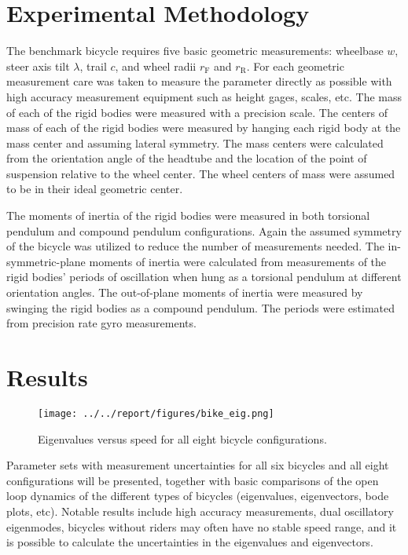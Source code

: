 \documentclass{bmd2010a}
\begin{document}
\section*{Experimental Methodology}
The benchmark bicycle requires five basic geometric measurements: wheelbase
$w$, steer axis tilt $\lambda$, trail $c$, and wheel radii $r_\mathrm{F}$
and $r_\mathrm{R}$. For each geometric measurement care was taken to measure
the parameter directly as possible with high accuracy measurement equipment
such as height gages, scales, etc. The mass of each of the rigid bodies were
measured with a precision scale. The centers of mass of each of the rigid
bodies were measured by hanging each rigid body at the mass center and
assuming lateral symmetry. The mass centers were calculated from the
orientation angle of the headtube and the location of the point of suspension
relative to the wheel center. The wheel centers of mass were assumed to be in
their ideal geometric center.

The moments of inertia of the rigid bodies were measured in both torsional
pendulum and compound pendulum configurations. Again the assumed symmetry of the
bicycle was utilized to reduce the number of measurements needed. The
in-symmetric-plane moments of inertia were calculated from measurements of the
rigid bodies' periods of oscillation when hung as a torsional pendulum at
different orientation angles. The out-of-plane moments of inertia were
measured by swinging the rigid bodies as a compound pendulum. The periods were
estimated from precision rate gyro measurements.
\section*{Results}
\begin{figure}[htbp]
    \begin{center}
        \texttt{[image: ../../report/figures/bike\_eig.png]}
    \end{center}
    \caption{Eigenvalues versus speed for all eight bicycle configurations.}
    \label{fig:bike_eig}
\end{figure}

Parameter sets with measurement uncertainties for all six bicycles and all
eight configurations  will be presented, together with basic comparisons of the
open loop dynamics of the different types of bicycles (eigenvalues,
eigenvectors, bode plots, etc). Notable results include high accuracy
measurements, dual oscillatory eigenmodes, bicycles without riders may often
have no stable speed range, and it is possible to calculate the uncertainties
in the eigenvalues and eigenvectors.



\end{document}
